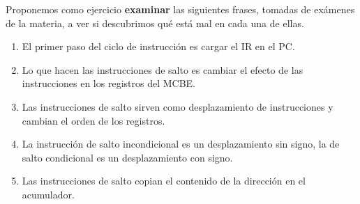 \documentclass[spanish,a4paper,]{article}
\providecommand{\tightlist}{%
  \setlength{\itemsep}{0pt}\setlength{\parskip}{0pt}}
\begin{document}
Proponemos como ejercicio \textbf{examinar} las siguientes frases,
tomadas de exámenes de la materia, a ver si descubrimos qué está mal en
cada una de ellas.

\begin{enumerate}
\def\labelenumi{\arabic{enumi}.}
\tightlist
\item
  El primer paso del ciclo de instrucción es cargar el IR en el PC.
\item
  Lo que hacen las instrucciones de salto es cambiar el efecto de las
  instrucciones en los registros del MCBE.
\item
  Las instrucciones de salto sirven como desplazamiento de instrucciones
  y cambian el orden de los registros.
\item
  La instrucción de salto incondicional es un desplazamiento sin signo,
  la de salto condicional es un desplazamiento con signo.
\item
  Las instrucciones de salto copian el contenido de la dirección en el
  acumulador.
\end{enumerate}
\end{document}
